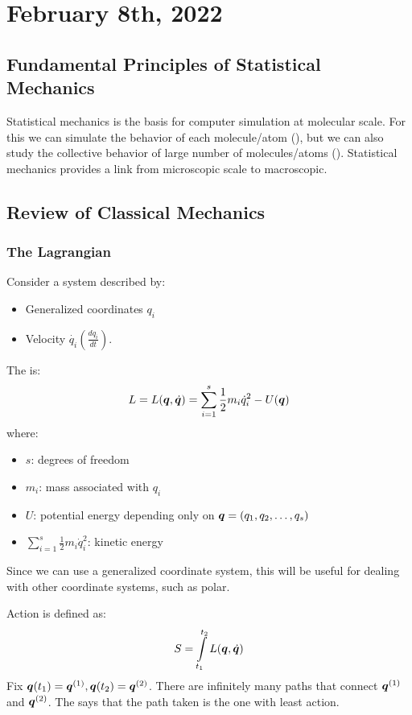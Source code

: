 \documentclass[../main/main.tex]{subfiles}
\begin{document}
\section{February 8th, 2022}
\subsection{Fundamental Principles of Statistical Mechanics}
Statistical mechanics is the basis for computer simulation at molecular scale. For this we can simulate the behavior of each molecule/atom (), but we can also study
the collective behavior of large number of molecules/atoms (). Statistical mechanics provides a link from microscopic scale to macroscopic.

\subsection{Review of Classical Mechanics}

\subsubsection{The Lagrangian}
Consider a system described by:
\begin{itemize}
	\item Generalized coordinates $q_i$
	\item Velocity $\dot{q_i}\left( \frac{dq_i}{dt} \right)$.
\end{itemize}

The  is: \[
	L = L(\bm{q}, \dot{\bm{q}}) = \sum\limits_{i=1}^{s} \frac{1}{2} m_i \dot{q}_i^2 - U(\bm{q})
\]
where:
\begin{itemize}
	\item $s$: degrees of freedom
	\item $m_i$: mass associated with $q_i$
	\item $U$: potential energy depending only on $\bm{q} = (q_1, q_2, \ldots,q_s)$
	\item $\sum\limits_{i=1}^{s} \frac{1}{2} m_i \dot{q}_i^2$: kinetic energy
\end{itemize}

\begin{remark}
	Since we can use a generalized coordinate system, this will be useful for dealing with other coordinate systems, such as polar.
\end{remark}

Action is defined as: \[
	S = \int\limits_{t_1}^{t_2}L(\bm{q},\dot{\bm{q}})
\]
Fix $\bm{q}(t_1) = \bm{q}^{(1)}, \bm{q}(t_2) = \bm{q}^{(2)}$. There are infinitely many paths that connect $\bm{q}^{(1)}$ and $\bm{q}^{(2)}$. The 
says that the path taken is the one with least action.\\
\end{document}
